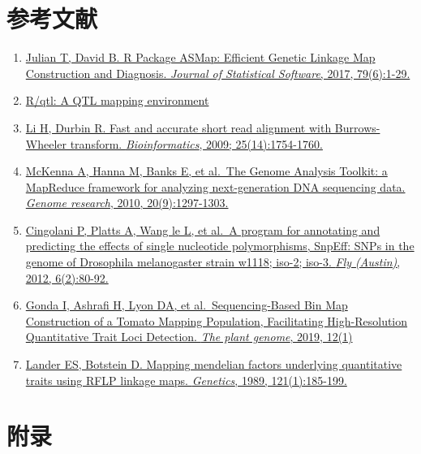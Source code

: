 \documentclass[
  a4paper,
  titlepage]{article}
\begin{document}
\newpage

\hypertarget{ux53c2ux8003ux6587ux732e}{%
\section{参考文献}\label{ux53c2ux8003ux6587ux732e}}

\begin{enumerate}
\def\labelenumi{\arabic{enumi}.}
\item
  \href{https://arxiv.org/abs/1705.06916v1}{Julian T, David B. R Package ASMap: Efficient Genetic Linkage Map Construction and Diagnosis. \emph{Journal of Statistical Software}, 2017, 79(6):1-29.}
\item
  \href{https://rqtl.org/}{R/qtl: A QTL mapping environment}
\item
  \href{https://pubmed.ncbi.nlm.nih.gov/19451168/}{Li H, Durbin R. Fast and accurate short read alignment with Burrows-Wheeler transform. \emph{Bioinformatics}, 2009; 25(14):1754-1760.}
\item
  \href{https://pubmed.ncbi.nlm.nih.gov/20644199/}{McKenna A, Hanna M, Banks E, et al.~The Genome Analysis Toolkit: a MapReduce framework for analyzing next-generation DNA sequencing data. \emph{Genome research}, 2010, 20(9):1297-1303.}
\item
  \href{https://pubmed.ncbi.nlm.nih.gov/22728672/}{Cingolani P, Platts A, Wang le L, et al.~A program for annotating and predicting the effects of single nucleotide polymorphisms, SnpEff: SNPs in the genome of Drosophila melanogaster strain w1118; iso-2; iso-3. \emph{Fly (Austin)}, 2012, 6(2):80-92.}
\item
  \href{https://pubmed.ncbi.nlm.nih.gov/30951101/}{Gonda I, Ashrafi H, Lyon DA, et al.~Sequencing-Based Bin Map Construction of a Tomato Mapping Population, Facilitating High-Resolution Quantitative Trait Loci Detection. \emph{The plant genome}, 2019, 12(1)}
\item
  \href{https://pubmed.ncbi.nlm.nih.gov/2563713/}{Lander ES, Botstein D. Mapping mendelian factors underlying quantitative traits using RFLP linkage maps. \emph{Genetics}, 1989, 121(1):185-199.}
\end{enumerate}

\newpage

\hypertarget{ux9644ux5f55}{%
\section{附录}\label{ux9644ux5f55}}
\end{document}
